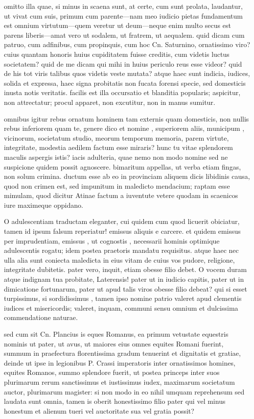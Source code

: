  omitto illa quae, si minus in scaena sunt, at certe, cum sunt prolata, laudantur, ut vivat cum suis, primum cum parente—nam meo iudicio pietas fundamentum est omnium virtutum—quem veretur ut deum—neque enim multo secus est parens liberis—amat vero ut sodalem, ut fratrem, ut aequalem. quid dicam cum patruo, cum adfinibus, cum propinquis, cum hoc Cn. Saturnino, ornatissimo viro? cuius quantam honoris huius cupiditatem fuisse creditis, cum videtis luctus societatem? quid de me dicam qui mihi in huius periculo reus esse videor? quid de his tot viris talibus quos videtis veste mutata? atque haec sunt indicia, iudices, solida et expressa, haec signa probitatis non fucata forensi specie, sed domesticis inusta notis veritatis. facilis est illa occursatio et blanditia popularis; aspicitur, non attrectatur; procul apparet, non excutitur, non in manus sumitur.

 omnibus igitur rebus ornatum hominem tam externis quam domesticis, non nullis rebus inferiorem quam te, genere dico et nomine , superiorem aliis, municipum , vicinorum, societatum studio, meorum temporum memoria, parem virtute, integritate, modestia aedilem factum esse miraris? hunc tu vitae splendorem maculis aspergis istis? iacis adulteria, quae nemo non modo nomine sed ne suspicione quidem possit agnoscere. bimaritum appellas, ut verba etiam fingas, non solum crimina. ductum esse ab eo in provinciam aliquem dicis libidinis causa, quod non crimen est, sed impunitum in maledicto mendacium; raptam esse mimulam, quod dicitur Atinae factum a iuventute vetere quodam in scaenicos iure maximeque oppidano.

 O adulescentiam traductam eleganter, cui quidem cum quod licuerit obiciatur, tamen id ipsum falsum reperiatur! emissus aliquis e carcere. et quidem emissus per imprudentiam, emissus , ut cognostis , necessarii hominis optimique adulescentis rogatu; idem postea praetoris mandatu requisitus. atque haec nec ulla alia sunt coniecta maledicta in eius vitam de cuius vos pudore, religione, integritate dubitetis. pater vero, inquit, etiam obesse filio debet. O vocem duram atque indignam tua probitate, Laterensis! pater ut in iudicio capitis, pater ut in dimicatione fortunarum, pater ut apud talis viros obesse filio debeat? qui si esset turpissimus, si sordidissimus , tamen ipso nomine patrio valeret apud clementis iudices et misericordis; valeret, inquam, communi sensu omnium et dulcissima commendatione naturae.

 sed cum sit Cn. Plancius is eques Romanus, ea primum vetustate equestris nominis ut pater, ut avus, ut maiores eius omnes equites Romani fuerint, summum in praefectura florentissima gradum tenuerint et dignitatis et gratiae, deinde ut ipse in legionibus P. Crassi imperatoris inter ornatissimos homines, equites Romanos, summo splendore fuerit, ut postea princeps inter suos plurimarum rerum sanctissimus et iustissimus iudex, maximarum societatum auctor, plurimarum magister: si non modo in eo nihil umquam reprehensum sed laudata sunt omnia, tamen is oberit honestissimo filio pater qui vel minus honestum et alienum tueri vel auctoritate sua vel gratia possit?

